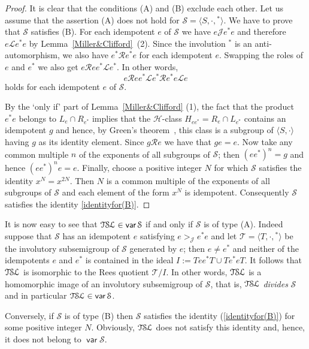 \documentclass[smallextended]{svjour3}
\def\Rc{\mathrel{\mathscr{R}}}
\def\Lc{\mathrel{\mathscr{L}}}
\def\Jc{\mathrel{\mathscr{J}}}
\newcommand{\TSL}{\ensuremath{\mathcal{T\kern-.5pt S\kern-.5pt L}}}
\DeclareMathOperator{\var}{\mathsf{var}}
\begin{document}
\begin{proof} It is clear that the conditions (A) and (B) exclude each other. Let us assume that the assertion (A) does not hold
for $\mathcal{S}=\langle S,\cdot,{}^*\rangle$. We have to prove that $\mathcal{S}$ satisfies (B). For each idempotent $e$ of $\mathcal{S}$
we have $e\Jc e^*e$ and therefore $e\Lc e^*e$ by Lemma~\ref{Miller&Clifford}~(2). Since the involution ${}^*$ is an anti-automorphism, we
also have $e^*\Rc e^*e$ for each idempotent $e$. Swapping the roles of $e$ and $e^*$ we also get $e\Rc ee^*\Lc e^*$. In other words,
$$e\Rc ee^*\Lc e^*\Rc e^*e\Lc e$$ holds for each idempotent $e$ of $\mathcal{S}$.

By the `only if' part of Lemma~\ref{Miller&Clifford} (1), the fact that the product $e^*e$ belongs to $L_e\cap R_{e^*}$ implies that the
$\mathscr{H}$-class $H_{ee^*}=R_e\cap L_{e^*}$ contains an idempotent $g$ and hence, by Green's theorem~\cite[Theorem~2.2.5]{how}, this
class is a subgroup of $\langle S,\cdot\rangle$ having $g$ as its identity element. Since $g\Rc e$ we have that $ge=e$. Now take any common
multiple $n$ of the exponents of all subgroups of $\mathcal{S}$; then $(ee^*)^n=g$ and hence $(ee^*)^ne=e$.  Finally, choose a positive
integer $N$ for which $\mathcal{S}$ satisfies the identity $x^N=x^{2N}$. Then $N$ is a common multiple of the exponents of all subgroups of
$\mathcal{S}$ and each element of the form $x^N$ is idempotent. Consequently $\mathcal{S}$ satisfies the identity \eqref{identityfor(B)}.
\end{proof}

It is now easy to see that $\TSL\in\var\mathcal{S}$ if and only if $\mathcal{S}$ is of type (A). Indeed suppose
that $\mathcal{S}$ has an idempotent $e$ satisfying $e\mathrel{{>}_{\!\!\!\Jc}} e^*e$ and let $\mathcal{T}=\langle T,\cdot,{}^*\rangle$
be the involutory subsemigroup of $\mathcal{S}$ generated by $e$; then $e\ne e^*$ and neither of the idempotents $e$ and $e^*$
is contained in the ideal $I:=Tee^*T\cup Te^*eT$. It follows that $\TSL$ is isomorphic to the Rees quotient $\mathcal{T}/I$.
In other words, $\TSL$ is a homomorphic image of an involutory subsemigroup of $\mathcal{S}$, that is, $\TSL$ \emph{divides}
$\mathcal{S}$ and in particular $\TSL\in \var\mathcal{S}$.

Conversely, if $\mathcal{S}$ is of type (B) then  $\mathcal{S}$ satisfies the identity (\ref{identityfor(B)})
 for some positive integer $N$. Obviously, $\TSL$ does not satisfy this identity and, hence, it does not belong to $\var\mathcal{S}$.
\end{document}
